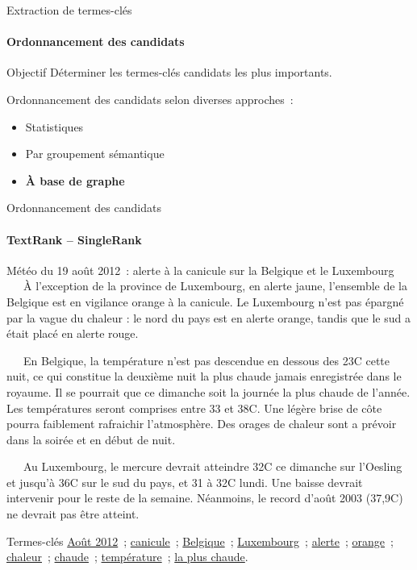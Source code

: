   \begin{frame}{Extraction de termes-clés}\framesubtitle{Ordonnancement des candidats}
    \begin{block}{Objectif}
      Déterminer les termes-clés candidats les plus importants.
    \end{block}

    \vspace{1em}

    Ordonnancement des candidats selon diverses approches~:
    \begin{itemize}
      \item{Statistiques~\cite[TF-IDF]{salton1975tfidf}}
      \item{Par groupement sémantique~\cite[KeyCluster]{liu2009keycluster}}
      \item{\textbf{À base de graphe}~\cite[TextRank]{mihalcea2004textrank}}
    \end{itemize}
  \end{frame}

  \begin{frame}{Ordonnancement des candidats}\framesubtitle{TextRank -- SingleRank}
    \begin{exampleblock}{\small
      Météo du 19 août 2012~: alerte à la canicule sur la Belgique et le
      Luxembourg
    }\justifying\small
      ~~~À l'exception de la province de Luxembourg, en alerte jaune, l'ensemble
      de la Belgique est en vigilance orange à la canicule. Le Luxembourg n'est
      pas épargné par la vague du chaleur : le nord du pays est en alerte
      orange, tandis que le sud a était placé en alerte rouge.

      ~~~En Belgique, la température n'est pas descendue en dessous des
      23\degre{}C cette nuit, ce qui constitue la deuxième nuit la plus chaude
      jamais enregistrée dans le royaume. Il se pourrait que ce dimanche soit la
      journée la plus chaude de l'année. Les températures seront comprises entre
      33 et 38\degre{}C. Une légère brise de côte pourra faiblement rafraichir
      l'atmosphère. Des orages de chaleur sont a prévoir dans la soirée et en
      début de nuit.

      ~~~Au Luxembourg, le mercure devrait atteindre 32\degre{}C ce dimanche sur
      l'Oesling et jusqu'à 36\degre{}C sur le sud du pays, et 31 à 32\degre{}C
      lundi. Une baisse devrait intervenir pour le reste de la semaine.
      Néanmoins, le record d'août 2003 (37,9\degre{}C) ne devrait pas être
      atteint.

      \begin{exampleblock}{\small Termes-clés}\justifying\small
        \underline{Août 2012}~; \underline{canicule}~;
        \underline{Belgique}~; \underline{Luxembourg}~; \underline{alerte}~;
        \underline{orange}~; \underline{chaleur}~; \underline{chaude}~;
        \underline{température}~; \underline{la plus chaude}.
      \end{exampleblock}
    \end{exampleblock}
  \end{frame}

